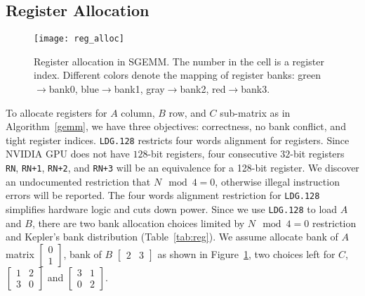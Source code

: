 \subsection{Register Allocation}
\label{sec:register}
\begin{figure}[htbp]
\begin{center}
\texttt{[image: reg\_alloc]}
\caption{Register allocation in SGEMM. The number in the cell is a register index.
Different colors denote the mapping of register banks: green$\rightarrow$bank0,
    blue$\rightarrow$bank1, gray$\rightarrow$bank2, red$\rightarrow$bank3.}
\label{fig:reg}
\end{center}
\end{figure}

To allocate registers for $A$ column, $B$ row, and $C$ sub-matrix as in Algorithm~\ref{gemm}, we have three objectives:
correctness, no bank conflict, and tight register indices.
{\tt LDG.128} restricts four words alignment for registers.
Since NVIDIA GPU does not have $128$-bit registers, 
four consecutive $32$-bit registers {\tt RN}, {\tt RN+1}, {\tt RN+2}, and {\tt RN+3} will be an equivalence for a 128-bit
register.
We discover an undocumented restriction that $N\mod4=0$, otherwise illegal instruction errors will be reported.
The four words alignment restriction for {\tt LDG.128} simplifies hardware logic and cuts down power.
Since we use {\tt LDG.128} to load $A$ and $B$, there are two bank allocation choices limited by $N\mod4=0$ restriction and Kepler's bank distribution (Table~\ref{tab:reg}).
We assume allocate bank of $A$ matrix $\begin{bmatrix} 0 \\ 1  \end{bmatrix}$,
   bank of $B$ $\begin{bmatrix} 2 & 3 \end{bmatrix}$ as shown in Figure~\ref{fig:reg}, two choices left for $C$,
$\begin{bmatrix} 1 & 2 \\ 3 & 0  \end{bmatrix}$ and
$\begin{bmatrix} 3 & 1 \\ 0 & 2  \end{bmatrix}$.
